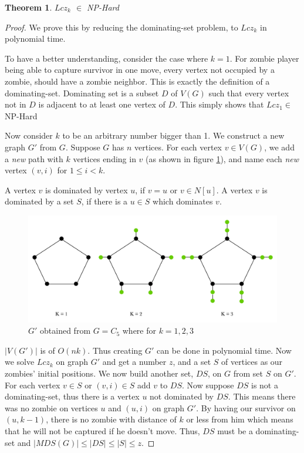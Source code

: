 \documentclass[1p]{elsarticle}
\newtheorem{theorem}{Theorem}
\begin{document}
	\begin{theorem}
		$Lcz_k$ $\in$ NP-Hard
	\end{theorem}
	\begin{proof}
		We prove this by reducing the dominating-set problem, to $Lcz_k$ in polynomial time.

		To have a better understanding, consider the case where $k=1$. For zombie player being able to capture survivor in
		one move, every vertex not occupied by a zombie, should have a zombie neighbor. This is exactly the definition
		of a dominating-set. Dominating set is a subset $D$ of $V(G)$ such that every vertex not in $D$ is adjacent to
		at least one vertex of $D$. This simply shows that $Lcz_1 \in$ NP-Hard 

		Now consider $k$ to be an arbitrary number bigger than 1. We construct a new graph $G'$ from $G$. Suppose $G$
		has $n$ vertices. For each vertex $v \in V(G)$, we add a {\it new} path with $k$ vertices ending in $v$ (as
		shown in figure \ref{fig:p7}), and name each {\it new} vertex $(v,i)$ for $1 \leq i < k$. 
		
		A vertex $v$ is dominated by vertex $u$, if $v = u$ or $v \in N[u]$. A vertex $v$ is dominated by a set $S$, if
		there is a $u \in S$ which dominates $v$.
		
		\begin{figure}[h!]
			\centering
			\includegraphics[width=0.9\linewidth]{fig/LCZ.png}
			\caption{$G'$ obtained from $G = C_5$ where for $k = 1,2,3$}
			\label{fig:p7}
		\end{figure}		


		$|V(G')|$ is of $O(nk)$. Thus creating $G'$ can be done in polynomial time. Now we solve $Lcz_k$ on graph $G'$
		and get a number $z$, and a set $S$ of vertices as our zombies' initial positions. We now build another set,
		$DS$, on $G$ from set $S$ on $G'$. For each vertex $v \in S$ or $(v,i) \in S$ add $v$ to $DS$. Now suppose $DS$
		is not a dominating-set, thus there is a vertex $u$ not dominated by $DS$. This means there was no zombie on
		vertices $u$ and $(u,i)$ on graph $G'$. By having our survivor on $(u,k-1)$, there is no zombie with distance of
		$k$ or less from him which means that he will not be captured if he doesn't move. Thus, $DS$ must be a
		dominating-set and $ |MDS(G)| \leq |DS| \leq |S| \leq z$.


\end{proof}
\end{document}
